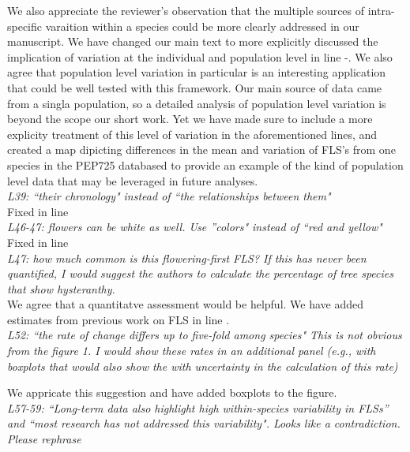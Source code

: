 \documentclass{article}[11pt]
\begin{document}
\indent We also appreciate the reviewer's observation that the multiple sources of intra-specific varaition within a species could be more clearly addressed in our manuscript. We have changed our main text to more explicitly discussed the implication of variation at the individual and population level in line -.  We also agree that population level variation in particular is an interesting application that could be well tested with this framework. Our main source of data came from a singla population, so a detailed analysis of population level variation is beyond the scope our short work. Yet we have made sure to include a more explicity treatment of this level of variation in the aforementioned lines, and created a map dipicting differences in the mean and variation of FLS's from one species in the PEP725 databased to provide an example of the kind of population level data that may be leveraged in future analyses.\\

\emph{L39: ``their chronology" instead of ``the relationships between them"}\\

Fixed in line \\

\emph{L46-47: flowers can be white as well. Use ''colors" instead of ``red and yellow"}\\

Fixed in line \\

\emph{L47: how much common is this flowering-first FLS? If this has never been quantified, I would suggest the authors to calculate the percentage of tree species that show hysteranthy.}\\

\noindent We agree that a quantitatve assessment would be helpful. We have added estimates from previous work on FLS \citep{Gougherty2018} in line .\\

\emph{L52: ``the rate of change differs up to five-fold among species" This is not obvious from the figure 1. I would show these rates in an additional panel (e.g., with boxplots that would also show the with uncertainty in the calculation of this rate)}

\noindent We appricate this suggestion and have added boxplots to the figure.\\

\emph{L57-59: ``Long-term data also highlight high within-species variability in FLSs” and “most research has not addressed this variability". Looks like a contradiction. Please rephrase}\\
\end{document}
